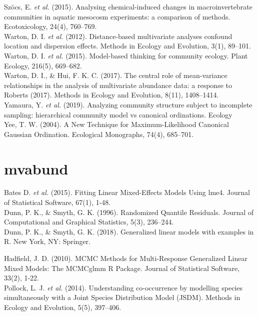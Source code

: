 \documentclass{article}
\begin{document}
Szöcs, E. \textit{et al.} (2015). Analysing chemical-induced changes in macroinvertebrate communities in aquatic mesocosm experiments: a comparison of methods. Ecotoxicology, 24(4), 760–769.\\ 

Warton, D. I. \textit{et al.} (2012). Distance-based multivariate analyses confound location and dispersion effects. Methods in Ecology and Evolution, 3(1), 89–101.  \\

Warton, D. I. \textit{et al.} (2015). Model-based thinking for community ecology. Plant Ecology, 216(5), 669–682. \\

Warton, D. I., \& Hui, F. K. C. (2017). The central role of mean-variance relationships in the analysis of multivariate abundance data: a response to Roberts (2017). Methods in Ecology and Evolution, 8(11), 1408–1414. \\

Yamaura, Y. \textit{et al.} (2019). Analyzing community structure subject to incomplete sampling: hierarchical community model vs canonical ordinations. Ecology\\

Yee, T. W. (2004). A New Technique for Maximum-Likelihood Canonical Gaussian Ordination. Ecological Monographs, 74(4), 685–701.\\


\section{mvabund}

Bates D. \textit{et al.} (2015). Fitting Linear Mixed-Effects Models Using lme4. Journal of Statistical Software, 67(1), 1-48. \\

Dunn, P. K., \& Smyth, G. K. (1996). Randomized Quantile Residuals. Journal of Computational and Graphical Statistics, 5(3), 236–244. \\

Dunn, P. K., \& Smyth, G. K. (2018). Generalized linear models with examples in R. New York, NY: Springer.\ \ 

Hadfield, J. D. (2010). MCMC Methods for Multi-Response Generalized Linear Mixed Models: The MCMCglmm R Package. Journal of Statistical Software, 33(2), 1-22. \\

Pollock, L. J. \textit{et al.} (2014). Understanding co-occurrence by modelling species simultaneously with a Joint Species Distribution Model (JSDM). Methods in Ecology and Evolution, 5(5), 397–406.\\
\end{document}
